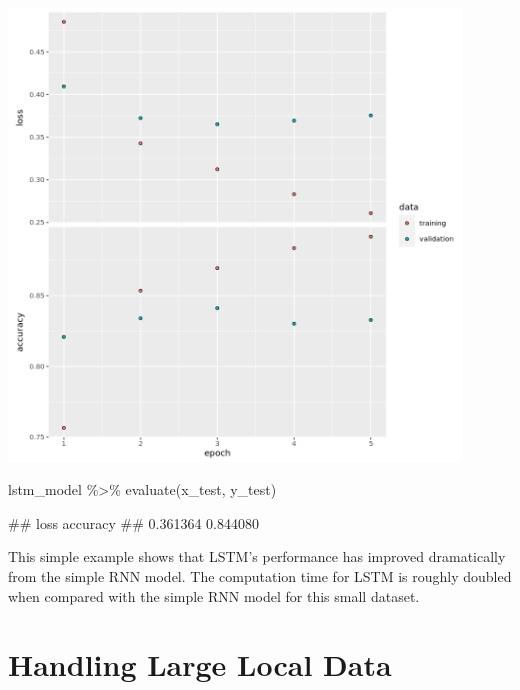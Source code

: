 \documentclass[
  12pt,
]{krantz}
\makeatletter
\newenvironment{Shaded}{\begin{snugshade}}{\end{snugshade}}
\newcommand{\FunctionTok}[1]{\textcolor[rgb]{0,0,0}{#1}}
\newcommand{\NormalTok}[1]{#1}
\newcommand{\SpecialCharTok}[1]{\textcolor[rgb]{0,0,0}{#1}}
\newenvironment{kframe}{%
\medskip{}
\setlength{\fboxsep}{.8em}
 \def\at@end@of@kframe{}%
 \ifinner\ifhmode%
  \def\at@end@of@kframe{\end{minipage}}%
  \begin{minipage}{\columnwidth}%
 \fi\fi%
 \def\FrameCommand##1{\hskip\@totalleftmargin \hskip-\fboxsep
 \colorbox{shadecolor}{##1}\hskip-\fboxsep
     \hskip-\linewidth \hskip-\@totalleftmargin \hskip\columnwidth}%
 \MakeFramed {\advance\hsize-\width
   \@totalleftmargin\z@ \linewidth\hsize
   \@setminipage}}%
 {\par\unskip\endMakeFramed%
 \at@end@of@kframe}
\renewenvironment{Shaded}{\begin{kframe}}{\end{kframe}}
\makeatother
\begin{document}
\includegraphics[width=0.9\textwidth,height=\textheight]{images/rnnhandson2.png}

\begin{Shaded}
\begin{Highlighting}[]
\NormalTok{lstm\_model }\SpecialCharTok{\%\textgreater{}\%}
   \FunctionTok{evaluate}\NormalTok{(x\_test, y\_test)}
\end{Highlighting}
\end{Shaded}

\begin{Shaded}
\begin{Highlighting}[]
\NormalTok{\#\#     loss accuracy }
\NormalTok{\#\# 0.361364 0.844080}
\end{Highlighting}
\end{Shaded}

This simple example shows that LSTM's performance has improved dramatically from the simple RNN model. The computation time for LSTM is roughly doubled when compared with the simple RNN model for this small dataset.

\hypertarget{appendix-appendix}{%
\appendix {}}


\hypertarget{largelocaldata}{%
\chapter{Handling Large Local Data}\label{largelocaldata}}
\end{document}
